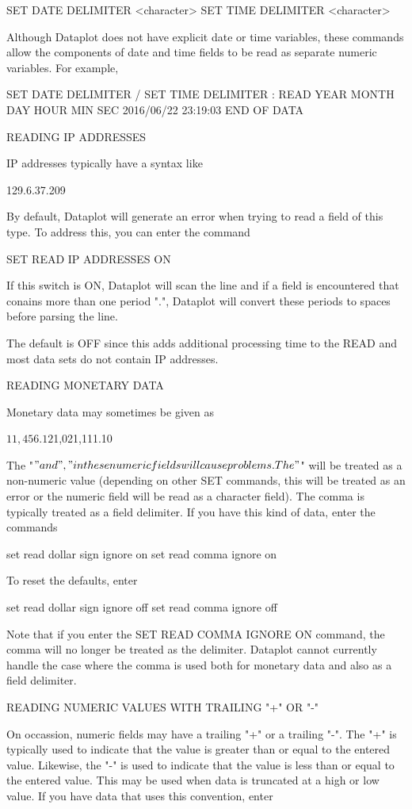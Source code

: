    SET DATE DELIMITER <character>
   SET TIME DELIMITER <character>

Although Dataplot does not have explicit date or time variables,
these commands allow the components of date and time fields to
be read as separate numeric variables.  For example,

   SET DATE DELIMITER /
   SET TIME DELIMITER :
   READ YEAR MONTH DAY HOUR MIN SEC
   2016/06/22  23:19:03
   END OF DATA

READING IP ADDRESSES

IP addresses typically have a syntax like

   129.6.37.209

By default, Dataplot will generate an error when trying to read a
field of this type.  To address this, you can enter the command

   SET READ IP ADDRESSES ON

If this switch is ON, Dataplot will scan the line and if a field is
encountered that conains more than one period ".", Dataplot will
convert these periods to spaces before parsing the line.

The default is OFF since this adds additional processing time to
the READ and most data sets do not contain IP addresses.

READING MONETARY DATA

Monetary data may sometimes be given as

   $11,456.12  $1,021,111.10

The "$" and "," in these numeric fields will cause problems.  The
"$" will be treated as a non-numeric value (depending on other
SET commands, this will be treated as an error or the numeric field
will be read as a character field).  The comma is typically treated
as a field delimiter.  If you have this kind of data, enter the
commands

    set read dollar sign ignore on
    set read comma ignore on

To reset the defaults, enter

    set read dollar sign ignore off
    set read comma ignore off

Note that if you enter the SET READ COMMA IGNORE ON command, the
comma will no longer be treated as the delimiter.  Dataplot cannot
currently handle the case where the comma is used both for monetary
data and also as a field delimiter.

READING NUMERIC VALUES WITH TRAILING "+" OR "-"

On occassion, numeric fields may have a trailing "+" or a
trailing "-".  The "+" is typically used to indicate that the
value is greater than or equal to the entered value.  Likewise, the
"-" is used to indicate that the value is less than or equal to the
entered value.  This may be used when data is truncated at a high
or low value.  If you have data that uses this convention, enter

